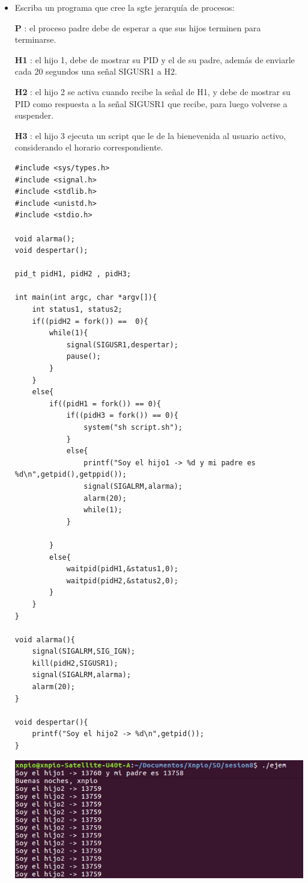 \documentclass[a4paper,12pt]{article}
\begin{document}
\begin{itemize}
\newpage

\item Escriba un programa que cree la sgte jerarquía de procesos:

\textbf{P} : el proceso padre debe de esperar a que sus hijos terminen para terminarse.

\textbf{H1} : el hijo 1, debe de mostrar su PID y el de su padre, además de enviarle cada 20 segundos una señal SIGUSR1 a H2.

\textbf{H2} : el hijo 2 se activa cuando recibe la señal de H1, y debe de mostrar su PID como respuesta a la señal SIGUSR1 que recibe, para luego volverse a suspender.

\textbf{H3} : el hijo 3 ejecuta un script que le de la bienevenida al usuario activo, considerando el horario correspondiente.

\begin{lstlisting}
#include <sys/types.h>
#include <signal.h>
#include <stdlib.h>
#include <unistd.h>
#include <stdio.h>

void alarma();
void despertar();

pid_t pidH1, pidH2 , pidH3;

int main(int argc, char *argv[]){
	int status1, status2;
	if((pidH2 = fork()) ==  0){
		while(1){
			signal(SIGUSR1,despertar);
			pause();	
		}		
	}
	else{
		if((pidH1 = fork()) == 0){
			if((pidH3 = fork()) == 0){
				system("sh script.sh");
			}
			else{
				printf("Soy el hijo1 -> %d y mi padre es %d\n",getpid(),getppid());
				signal(SIGALRM,alarma);
				alarm(20);
				while(1);
			}	
			
		}
		else{
			waitpid(pidH1,&status1,0);
			waitpid(pidH2,&status2,0);
		}
	}
}

void alarma(){
	signal(SIGALRM,SIG_IGN);
	kill(pidH2,SIGUSR1);
	signal(SIGALRM,alarma);
	alarm(20);
}

void despertar(){
	printf("Soy el hijo2 -> %d\n",getpid());
}

\end{lstlisting}

\begin{center}
 \includegraphics[scale=0.5]{3.png}
\end{center}


\end{itemize}
\end{document}
